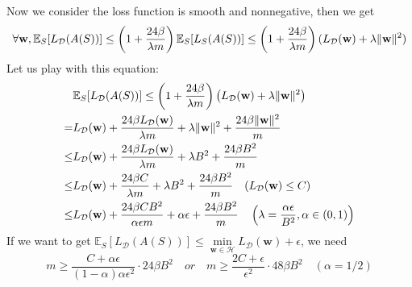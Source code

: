 Now we consider the loss function is smooth and nonnegative, then we get
\[ 
	\forall \mathbf{w}, 
	\mathbb{E}_S[L_\mathcal{D}(A(S))]
	\le \left( 1+\frac{24\beta}{\lambda m} \right) \mathbb{E}_S [L_S(A(S))]
	\le \left( 1+\frac{24\beta}{\lambda m} \right) 
	(L_\mathcal{D}(\mathbf{w})+\lambda \Arrowvert \mathbf{w} \Arrowvert^2)
\]
Let us play with this equation:
\[
	\begin{aligned}
		&\mathbb{E}_S[L_\mathcal{D}(A(S))] \le \left( 1 + \frac{24\beta}{\lambda m} \right)
		\left( L_\mathcal{D}(\mathbf{w}) + \lambda \Arrowvert \mathbf{w} \Arrowvert^2 \right)\\
		=& L_\mathcal{D}(\mathbf{w}) + 
		\frac{24 \beta L_\mathcal{D}(\mathbf{w})}{\lambda m} + \lambda \Arrowvert \mathbf{w} \Arrowvert^2
		+ \frac{24\beta \Arrowvert \mathbf{w} \Arrowvert^2}{m} \\
		\le& L_\mathcal{D}(\mathbf{w}) + 
		\frac{24 \beta L_\mathcal{D}(\mathbf{w})}{\lambda m} + \lambda B^2
		+ \frac{24\beta B^2}{m} \\
		\le& L_\mathcal{D}(\mathbf{w}) + 
		\frac{24 \beta C}{\lambda m} + \lambda B^2
		+ \frac{24\beta B^2}{m} \quad (L_\mathcal{D}(\mathbf{w}) \le C) \\
		\le& L_\mathcal{D}(\mathbf{w}) + 
		\frac{24 \beta C B^2}{\alpha \epsilon m} + \alpha \epsilon
		+ \frac{24\beta B^2}{m} \quad \left(\lambda = \frac{\alpha\epsilon}{B^2}, \alpha \in (0,1)\right)
	\end{aligned}
\]
If we want to get
$ \mathbb{E}_S [L_\mathcal{D}(A(S))] \le \min\limits_{\mathbf{w} \in \mathcal{H}} L_\mathcal{D}(\mathbf{w}) + \epsilon $, 
we need
\[ 
	m \ge \frac{C + \alpha \epsilon}{ (1-\alpha)\alpha \epsilon^2} \cdot 24 \beta B^2
	\quad or \quad
	m \ge \frac{2C + \epsilon}{\epsilon^2} \cdot 48 \beta B^2 \quad ( \alpha = 1/2)
\]


